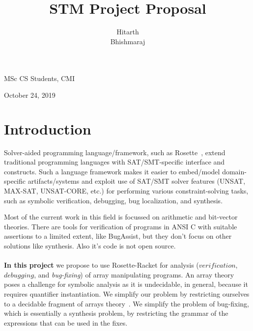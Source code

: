 \documentclass[a4paper, 12pt, notitlepage] {article}
\author{Hitarth \\ Bhishmaraj}
\title{STM Project Proposal}
\date{} %
\newcommand{\hide}[1]{}
\newcommand{\mscmt}[1]{{\color{blue} \tiny{Srivas: {#1}}}}
\begin{document}
\maketitle		


\begin{center}
MSc CS Students, CMI
\end{center}
\begin{center}
October 24, 2019
\end{center}
\newpage

\section{Introduction}

Solver-aided programming language/framework, such as Rosette~\cite{rosette_paper}, extend traditional programming languages with SAT/SMT-specific interface and constructs.
Such a language framework makes it easier to embed/model domain-specific artifacts/systems and exploit use of SAT/SMT solver features (UNSAT, MAX-SAT, UNSAT-CORE, etc.) for performing various constraint-solving tasks, such as symbolic verification, debugging, bug localization, and synthesis.
%
\hide{
domain-specific languages (SDSLs) are the languages, for a specific domain, which ease the construction of programs by giving us the ability to automate the task like verification, debugging and synthesis. But implementing the SDSLs from the scretch is a very hard task. To simplify our taks, we use Rosette \cite{rosette_paper}. Rosette is a framework for designing solver-aided languages, and is itself a solver-aided language embedded in Racket. Rosette helps us to easily exploit the power of SAT//SMT solver in designing solutions to domain specific constraint solving problems.\\
\\
}
%
Most of the current work in this field is focussed on arithmetic and bit-vector theories. There are tools for verification of programs in ANSI C with suitable assertions to  a limited extent, like BugAssist\cite{bugassist}, but they don't focus on other solutions like synthesis. Also it's code is not open source.\\
 \\
{\bf In this project} we propose to use Rosette-Racket for analysis ($verification$, $debugging$, and \emph{bug-fixing}) of array manipulating programs.
An array theory poses a challenge for symbolic analysis as it is undecidable, in general, because it requires quantifier instantiation.
We simplify our problem by restricting ourselves to a decidable fragment of arrays theory~\cite{weakeqarrays}.
We simplify the problem of bug-fixing, which is essentially a synthesis problem, by restricting the grammar of the expressions that can be used in the fixes.
\end{document}
